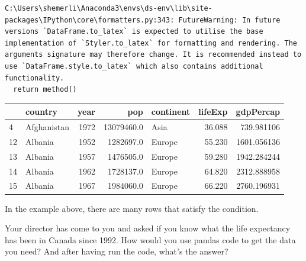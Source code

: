\documentclass[
  letterpaper,
  DIV=11,
  numbers=noendperiod]{scrreprt}
\begin{document}
\begin{verbatim}
C:\Users\shemerli\Anaconda3\envs\ds-env\lib\site-packages\IPython\core\formatters.py:343: FutureWarning: In future versions `DataFrame.to_latex` is expected to utilise the base implementation of `Styler.to_latex` for formatting and rendering. The arguments signature may therefore change. It is recommended instead to use `DataFrame.style.to_latex` which also contains additional functionality.
  return method()
\end{verbatim}

\begin{tabular}{llrrlrr}
\toprule
{} &      country &  year &         pop & continent &  lifeExp &    gdpPercap \\
\midrule
4  &  Afghanistan &  1972 &  13079460.0 &      Asia &   36.088 &   739.981106 \\
12 &      Albania &  1952 &   1282697.0 &    Europe &   55.230 &  1601.056136 \\
13 &      Albania &  1957 &   1476505.0 &    Europe &   59.280 &  1942.284244 \\
14 &      Albania &  1962 &   1728137.0 &    Europe &   64.820 &  2312.888958 \\
15 &      Albania &  1967 &   1984060.0 &    Europe &   66.220 &  2760.196931 \\
\bottomrule
\end{tabular}

In the example above, there are many rows that satisfy the condition.

\begin{tcolorbox}[enhanced jigsaw, colframe=quarto-callout-warning-color-frame, toprule=.15mm, colback=white, leftrule=.75mm, rightrule=.15mm, breakable, colbacktitle=quarto-callout-warning-color!10!white, arc=.35mm, bottomtitle=1mm, bottomrule=.15mm, titlerule=0mm, title={Challenge 2}, toptitle=1mm, left=2mm, opacityback=0, coltitle=black, opacitybacktitle=0.6]
Your director has come to you and asked if you know what the life
expectancy has been in Canada since 1992. How would you use pandas code
to get the data you need? And after having run the code, what's the
answer?
\end{tcolorbox}
\end{document}
